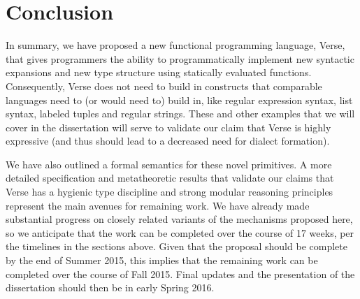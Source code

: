 \section{Conclusion}
In summary, we have proposed a new functional programming language, Verse, that gives programmers the ability to programmatically implement new syntactic expansions and new type structure using statically evaluated functions. Consequently, Verse does not need to build in constructs that comparable languages need to (or would need to) build in, like regular expression syntax, list syntax, labeled tuples and regular strings. These and other examples that we will cover in the dissertation will serve to validate our claim that Verse is highly expressive (and thus should lead to a decreased need for dialect formation).

We have also outlined a formal semantics for these novel primitives. A more detailed specification and metatheoretic results that validate our claims that Verse has a hygienic type discipline and strong modular reasoning principles represent the main avenues for remaining work. We have already made substantial progress on closely related variants of the mechanisms proposed here, so we anticipate that the work can be completed over the course of 17 weeks, per the timelines in the sections above. Given that the proposal should be complete by the end of Summer 2015, this implies that the remaining work can be completed over the course of Fall 2015. Final updates and the presentation of the dissertation should then be in early Spring 2016.





